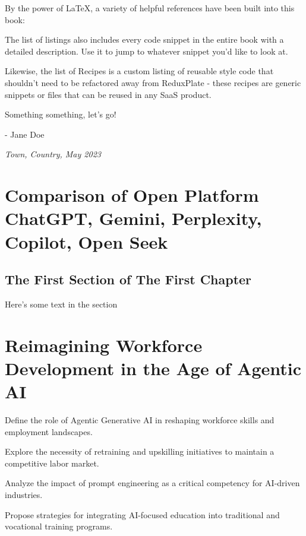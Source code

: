 \documentclass[a4paper,headinclude=on,footinclude=on,12pt,oneside]{scrbook}
\begin{document}

By the power of LaTeX, a variety of helpful references have been built into this book:



The list of listings also includes every code snippet in the entire book with a detailed description. Use it to jump to whatever snippet you'd like to look at.

Likewise, the list of Recipes is a custom listing of reusable style code that shouldn't need to be refactored away from ReduxPlate - these recipes are generic snippets or files that can be reused in any SaaS product.


Something something, let's go!

- Jane Doe

\textit{Town, Country, May 2023}


\chapter{Comparison of Open Platform ChatGPT, Gemini, Perplexity, Copilot, Open Seek  }

\section{The First Section of The First Chapter}

Here's some text in the section



\chapter{Reimagining Workforce Development in the Age of Agentic AI}

\begin{arrows}
	\item Define the role of Agentic Generative AI in reshaping workforce skills and employment landscapes.
	\item Explore the necessity of retraining and upskilling initiatives to maintain a competitive labor market.
	\item Analyze the impact of prompt engineering as a critical competency for AI-driven industries.
	\item Propose strategies for integrating AI-focused education into traditional and vocational training programs.
\end{arrows}
\end{document}
